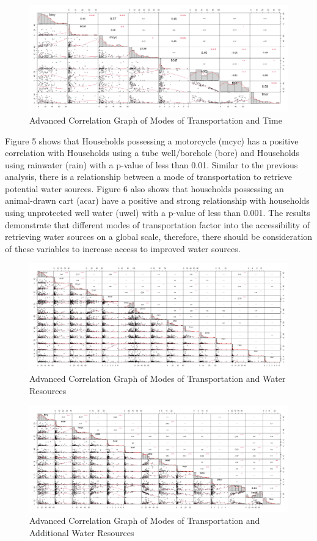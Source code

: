 \documentclass[10pt,twoside]{article}
\numberwithin{equation}{section}
\newcommand{\?}{\stackrel{?}{=}}
\begin{document}
\begin{figure}[h!]
  \centering
  \includegraphics[width=.7\textwidth]{transportation-time}
  \caption{Advanced Correlation Graph of Modes of Transportation and Time}
  \label{fig:transporation-time}
\end{figure}
Figure 5 shows that Households possessing a motorcycle (mcyc) has a positive correlation with Households using a tube well/borehole (bore) and Households using rainwater (rain) with a p-value of less than 0.01. Similar to the previous analysis, there is a relationship between a mode of transportation to retrieve potential water sources. Figure 6 also shows that households possessing an animal-drawn cart (acar) have a positive and strong relationship with households using unprotected well water (uwel) with a p-value of less than 0.001. The results demonstrate that different modes of transportation factor into the accessibility of retrieving water sources on a global scale, therefore, there should be consideration of these variables to increase access to improved water sources. 
\begin{figure}[h!]
  \centering
  \includegraphics[width=.7\textwidth]{transportation-water-1}
  \caption{Advanced Correlation Graph of Modes of Transportation and Water Resources}
  \label{fig:transporation-water-one}
\end{figure}

\begin{figure}[h!]
  \centering
  \includegraphics[width=.7\textwidth]{transportation-water-2}
  \caption{Advanced Correlation Graph of Modes of Transportation and Additional Water Resources}
  \label{fig:transporation-water-two}
\end{figure}
\end{document}
